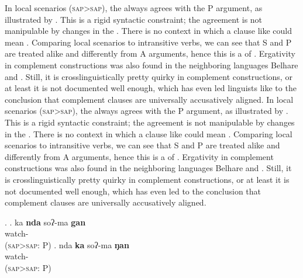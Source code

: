 In local scenarios (\textsc{sap}>\textsc{sap}), the  always agrees with the P argument, as illustrated by \Next. This is a rigid syntactic constraint; the agreement is not manipulable by changes in the . There is no context in which a clause like \Next[a] could mean . Comparing local scenarios to intransitive verbs, we can see that S and P are treated alike and differently from  A arguments, hence this is a  of  . Ergativity in complement constructions was also found in the neighboring languages Belhare \citep{Bickel2004Hidden, Bickeletal2001Syntactic} and  \citep{Bickeletal2010Ditransitives}. Still, it is crosslinguistically pretty quirky in complement constructions, or at least it is not documented well enough, which has even led linguists like \citet[135]{Dixon1994Ergativity}  to the conclusion that complement clauses are universally accusatively aligned. 
In local scenarios (\textsc{sap}>\textsc{sap}), the  always agrees with the P argument, as illustrated by \Next. This is a rigid syntactic constraint; the agreement is not manipulable by changes in the . There is no context in which a clause like \Next[a] could mean . Comparing local scenarios to intransitive verbs, we can see that S and P are treated alike and differently from  A arguments, hence this is a  of  . Ergativity in complement constructions was also found in the neighboring languages Belhare \citep{Bickel2004Hidden, Bickeletal2001Syntactic} and  \citep{Bickeletal2010Ditransitives}. Still, it is crosslinguistically pretty quirky in complement constructions, or at least it is not documented well enough, which has even led \citet[135]{Dixon1994Ergativity}  to the conclusion that complement clauses are universally accusatively aligned. 


\ex. \ag. ka {\bf nda} soʔ-ma {\bf gan}\\
  watch- \\
	(\textsc{sap}>\textsc{sap}: P)
\bg. nda {\bf ka} soʔ-ma {\bf ŋan}\\
    watch- \\
	(\textsc{sap}>\textsc{sap}: P) 



